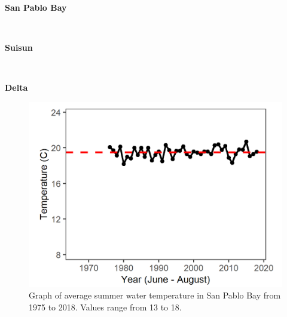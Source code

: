 \documentclass[
]{book}
\begin{document}
\begin{panel-grid}

\begin{columns-nocenter}

\begin{column800}

\textbf{San Pablo Bay}

\end{column800}

\begin{column40}

~

\end{column40}

\begin{column800}

\textbf{Suisun}

\end{column800}

\begin{column40}

~

\end{column40}

\begin{column800}

\textbf{Delta}

\end{column800}

\end{columns-nocenter}

\begin{columns-nocenter}

\begin{column800}

\begin{expand}

\begin{figure}
\includegraphics[width=15.25in]{figures/temp_splsummer} \caption{Graph of average summer water temperature in San Pablo Bay from 1975 to 2018. Values range from 13 to 18.}\label{fig:unnamed-chunk-57}
\end{figure}


\end{expand}
\end{column800}
\end{columns-nocenter}
\end{panel-grid}
\end{document}
